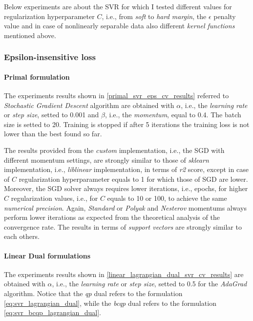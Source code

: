 Below experiments are about the SVR for which I tested different values for regularization hyperparameter $C$, i.e., from \emph{soft} to \emph{hard margin}, the $\epsilon$ penalty value and in case of nonlinearly separable data also different \emph{kernel functions} mentioned above.

\subsubsection{Epsilon-insensitive loss}

\paragraph{Primal formulation}

The experiments results shown in \ref{primal_svr_eps_cv_results} referred to \emph{Stochastic Gradient Descent} algorithm are obtained with $\alpha$, i.e., the \emph{learning rate} or \emph{step size}, setted to 0.001 and $\beta$, i.e., the \emph{momentum}, equal to 0.4. The batch size is setted to 20. Training is stopped if after 5 iterations the training loss is not lower than the best found so far.



The results provided from the \emph{custom} implementation, i.e., the SGD with different momentum settings, are strongly similar to those of \emph{sklearn} implementation, i.e., \emph{liblinear} \cite{fan2008liblinear} implementation, in terms of \emph{r2} score, except in case of $C$ regularization hyperparameter equals to 1 for which those of SGD are lower. Moreover, the SGD solver always requires lower iterations, i.e., epochs, for higher $C$ regularization values, i.e., for $C$ equals to 10 or 100, to achieve the same \emph{numerical precision}. Again, \emph{Standard} or \emph{Polyak} and \emph{Nesterov} momentums always perform lower iterations as expected from the theoretical analysis of the convergence rate. The results in terms of \emph{support vectors} are strongly similar to each others.

\paragraph{Linear Dual formulations}

The experiments results shown in \ref{linear_lagrangian_dual_svr_cv_results} are obtained with $\alpha$, i.e., the \emph{learning rate} or \emph{step size}, setted to 0.5 for the \emph{AdaGrad} algorithm. Notice that the \emph{qp} dual refers to the formulation \eqref{eq:svr_lagrangian_dual}, while the \emph{bcqp} dual refers to the formulation \eqref{eq:svr_bcqp_lagrangian_dual}.

